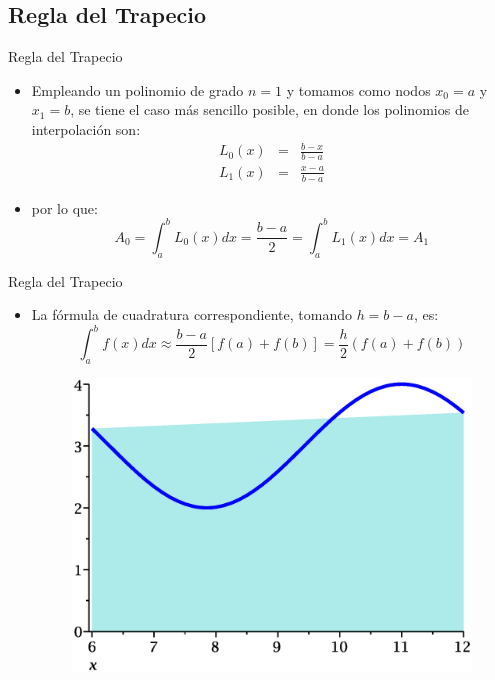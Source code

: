 \documentclass[12pt]{beamer}
\begin{document}
\subsection{Regla del Trapecio}
\begin{frame}{Regla del Trapecio}
  \begin{itemize}
    \item Empleando un polinomio de grado $n = 1$ y tomamos como nodos $x_0 = a$ y $x_1 = b$, se tiene el caso m\'as sencillo posible, en donde los polinomios de interpolaci\'on son:
    \begin{eqnarray}
     L_0(x) & = & \frac{b-x}{b-a}\nonumber\\
     L_1(x) & = & \frac{x-a}{b-a}\nonumber
    \end{eqnarray}
    \item<2-> por lo que:
    $$
    A_0 = \int_a^bL_0(x)dx = \frac{b-a}{2} = \int_a^bL_1(x)dx = A_1
    $$    
  \end{itemize}
\end{frame}
\begin{frame}{Regla del Trapecio}
  \begin{itemize}
    \item La f\'ormula de cuadratura correspondiente, tomando $h=b-a$, es:
    $$
    \int_a^bf(x)dx \approx \frac{b-a}{2}[f(a)+f(b)] = \dfrac{h}{2}\left(f(a)+f(b)\right)
    $$    
    \begin{center}
     \begin{figure}
     \includegraphics[scale=0.25]{trapz.eps}
    \end{figure}
    \end{center}
  \end{itemize}
\end{frame}
\end{document}
